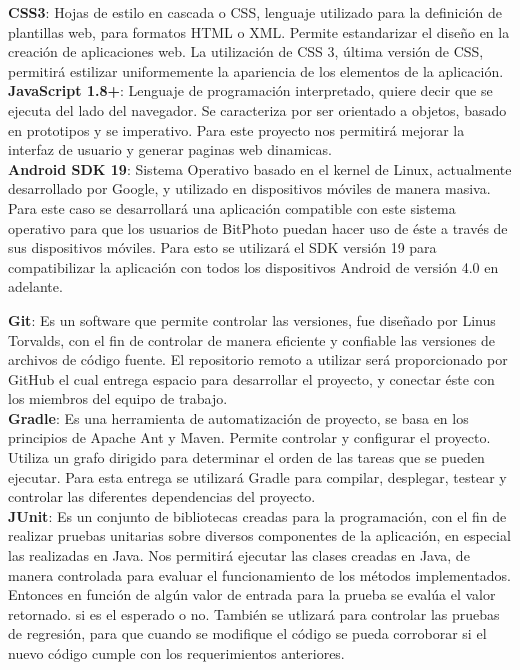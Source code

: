 \documentclass{memoria}
\begin{document}
\textbf{CSS3}: Hojas de estilo en cascada o CSS, lenguaje utilizado para la definición de plantillas web, para formatos HTML o XML. Permite estandarizar el diseño en la creación de aplicaciones web. La utilización de CSS 3, última versión de CSS, permitirá estilizar uniformemente la apariencia de los elementos de la aplicación.\\

\textbf{JavaScript 1.8+}: Lenguaje de programación interpretado, quiere decir que se ejecuta del lado del navegador. Se caracteriza por ser orientado a objetos, basado en prototipos y se imperativo. Para este proyecto nos permitirá mejorar la interfaz de usuario y generar paginas web dinamicas.\\

\textbf{Android SDK 19}: Sistema Operativo basado en el kernel de Linux, actualmente desarrollado por Google, y utilizado en dispositivos móviles de manera masiva. Para este caso se desarrollará una aplicación compatible con este sistema operativo para que los usuarios de BitPhoto puedan hacer uso de éste a través de sus dispositivos móviles. Para esto se utilizará el SDK versión 19 para compatibilizar la aplicación con todos los dispositivos Android de versión 4.0 en adelante.\\


\textbf{Git}: Es un software que permite controlar las versiones, fue diseñado por Linus Torvalds, con el fin de controlar de manera eficiente y confiable las versiones de archivos de código fuente. El repositorio remoto a utilizar será proporcionado por GitHub el cual entrega espacio para desarrollar el proyecto, y conectar éste con los miembros del equipo de trabajo.\\


\textbf{Gradle}: Es una herramienta de automatización de proyecto, se basa en los principios de Apache Ant y Maven. Permite controlar y configurar el proyecto. Utiliza un grafo dirigido para determinar el orden de las tareas que se pueden ejecutar. Para esta entrega se utilizará Gradle para compilar, desplegar, testear y controlar las diferentes dependencias del proyecto.\\

\textbf{JUnit}: Es un conjunto de bibliotecas creadas para la programación, con el fin de realizar pruebas unitarias sobre diversos componentes de la aplicación, en especial las realizadas en Java. Nos permitirá ejecutar las clases creadas en Java, de manera controlada para evaluar el funcionamiento de los métodos implementados. Entonces en función de algún valor de entrada para la prueba se evalúa el valor retornado. si es el esperado o no. También se utlizará para controlar las pruebas de regresión, para que cuando se modifique el código se pueda corroborar si el nuevo código cumple con los requerimientos anteriores.\\
\end{document}
